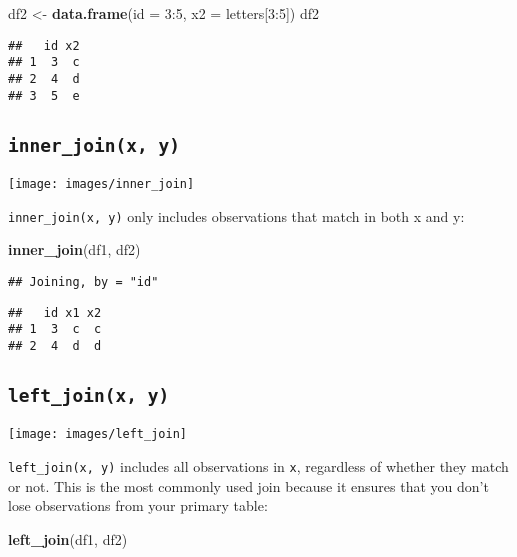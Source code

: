 \documentclass[]{book}
\newenvironment{Shaded}{\begin{snugshade}}{\end{snugshade}}
\newcommand{\KeywordTok}[1]{\textcolor[rgb]{0.13,0.29,0.53}{\textbf{{#1}}}}
\newcommand{\DataTypeTok}[1]{\textcolor[rgb]{0.13,0.29,0.53}{{#1}}}
\newcommand{\DecValTok}[1]{\textcolor[rgb]{0.00,0.00,0.81}{{#1}}}
\newcommand{\StringTok}[1]{\textcolor[rgb]{0.31,0.60,0.02}{{#1}}}
\newcommand{\NormalTok}[1]{{#1}}
\begin{document}
\begin{Shaded}
\begin{Highlighting}[]
\NormalTok{df2 <-}\StringTok{ }\KeywordTok{data.frame}\NormalTok{(}\DataTypeTok{id =} \DecValTok{3}\NormalTok{:}\DecValTok{5}\NormalTok{, }\DataTypeTok{x2 =} \NormalTok{letters[}\DecValTok{3}\NormalTok{:}\DecValTok{5}\NormalTok{])}
\NormalTok{df2}
\end{Highlighting}
\end{Shaded}

\begin{verbatim}
##   id x2
## 1  3  c
## 2  4  d
## 3  5  e
\end{verbatim}

\subsection{\texorpdfstring{\texttt{inner\_join(x,\ y)}}{inner\_join(x, y)}}\label{inner_joinx-y}

\texttt{[image: images/inner\_join]}

\texttt{inner\_join(x,\ y)} only includes observations that match in
both x and y:

\begin{Shaded}
\begin{Highlighting}[]
\KeywordTok{inner_join}\NormalTok{(df1, df2)}
\end{Highlighting}
\end{Shaded}

\begin{verbatim}
## Joining, by = "id"
\end{verbatim}

\begin{verbatim}
##   id x1 x2
## 1  3  c  c
## 2  4  d  d
\end{verbatim}

\subsection{\texorpdfstring{\texttt{left\_join(x,\ y)}}{left\_join(x, y)}}\label{left_joinx-y}

\texttt{[image: images/left\_join]}

\texttt{left\_join(x,\ y)} includes all observations in \texttt{x},
regardless of whether they match or not. This is the most commonly used
join because it ensures that you don't lose observations from your
primary table:

\begin{Shaded}
\begin{Highlighting}[]
\KeywordTok{left_join}\NormalTok{(df1, df2)}
\end{Highlighting}
\end{Shaded}
\end{document}
